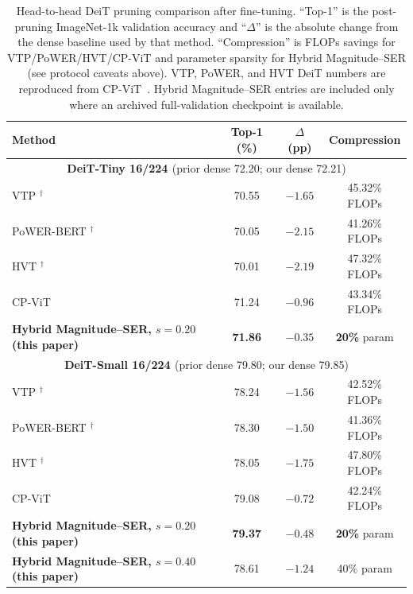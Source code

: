 \documentclass[11pt]{article}
\theoremstyle{plain}
\theoremstyle{definition}
\theoremstyle{remark}
\newcommand{\1}{\mathbf{1}}
\begin{document}
\begin{table}[ht]
\centering
\caption{Head-to-head DeiT pruning comparison after fine-tuning.  ``Top-1'' is the post-pruning ImageNet-1k validation accuracy and ``\(\Delta\)'' is the absolute change from the dense baseline used by that method.  ``Compression'' is FLOPs savings for VTP/PoWER/HVT/CP-ViT and parameter sparsity for Hybrid Magnitude--SER (see protocol caveats above).  VTP, PoWER, and HVT DeiT numbers are reproduced from CP-ViT~\cite{song2022cp}.  Hybrid Magnitude--SER entries are included only where an archived full-validation checkpoint is available.}
\label{tab:deit_prior_comparison}
\scriptsize
\setlength{\tabcolsep}{4pt}
\begin{tabular}{lccc}
\toprule
Method & Top-1 (\%) & \(\Delta\) (pp) & Compression \\
\midrule
\multicolumn{4}{c}{\textbf{DeiT-Tiny 16/224 \cite{touvron2021training}} (prior dense 72.20; our dense 72.21)} \\
VTP \cite{zhu2021visual}$^\dagger$              & 70.55 & \(-1.65\) & 45.32\% FLOPs \\
PoWER-BERT \cite{goyal2020powerbert}$^\dagger$  & 70.05 & \(-2.15\) & 41.26\% FLOPs \\
HVT \cite{pan2021scalable}$^\dagger$            & 70.01 & \(-2.19\) & 47.32\% FLOPs \\
CP-ViT \cite{song2022cp}                        & 71.24 & \(-0.96\) & 43.34\% FLOPs \\
\textbf{Hybrid Magnitude--SER, \(s=0.20\) (this paper)} & \textbf{71.86} & \(\boldsymbol{-0.35}\) & \textbf{20\%} param \\
\midrule
\multicolumn{4}{c}{\textbf{DeiT-Small 16/224 \cite{touvron2021training}} (prior dense 79.80; our dense 79.85)} \\
VTP \cite{zhu2021visual}$^\dagger$              & 78.24 & \(-1.56\) & 42.52\% FLOPs \\
PoWER-BERT \cite{goyal2020powerbert}$^\dagger$  & 78.30 & \(-1.50\) & 41.36\% FLOPs \\
HVT \cite{pan2021scalable}$^\dagger$            & 78.05 & \(-1.75\) & 47.80\% FLOPs \\
CP-ViT \cite{song2022cp}                        & 79.08 & \(-0.72\) & 42.24\% FLOPs \\
\textbf{Hybrid Magnitude--SER, \(s=0.20\) (this paper)} & \textbf{79.37} & \(\boldsymbol{-0.48}\) & \textbf{20\%} param \\
\textbf{Hybrid Magnitude--SER, \(s=0.40\) (this paper)} & 78.61 & \(-1.24\) & 40\% param \\

\end{tabular}
\end{table}
\end{document}
